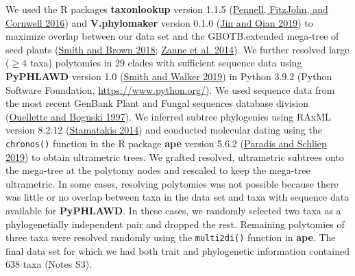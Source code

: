 \documentclass[
  12pt,
]{article}
\begin{document}
We used the R packages \textbf{taxonlookup} version 1.1.5 (\protect\hyperlink{ref-pennell_simple_2016}{Pennell, FitzJohn, and Cornwell 2016}) and \textbf{V.phylomaker} version 0.1.0 (\protect\hyperlink{ref-jin_vphylomaker_2019}{Jin and Qian 2019}) to maximize overlap between our data set and the GBOTB.extended mega-tree of seed plants (\protect\hyperlink{ref-smith_constructing_2018}{Smith and Brown 2018}; \protect\hyperlink{ref-zanne_three_2014}{Zanne et al. 2014}). We further resolved large (\(\ge4\) taxa) polytomies in 29 clades with sufficient sequence data using \textbf{PyPHLAWD} version 1.0 (\protect\hyperlink{ref-smith_pyphlawd_2019}{Smith and Walker 2019}) in Python 3.9.2 (Python Software Foundation, \url{https://www.python.org/}). We used sequence data from the most recent GenBank Plant and Fungal sequences database division (\protect\hyperlink{ref-ouellette_database_1997}{Ouellette and Boguski 1997}). We inferred subtree phylogenies using RAxML version 8.2.12 (\protect\hyperlink{ref-stamatakis_raxml_2014}{Stamatakis 2014}) and conducted molecular dating using the \texttt{chronos()} function in the R package \textbf{ape} version 5.6.2 (\protect\hyperlink{ref-paradis_ape_2019}{Paradis and Schliep 2019}) to obtain ultrametric trees. We grafted resolved, ultrametric subtrees onto the mega-tree at the polytomy nodes and rescaled to keep the mega-tree ultrametric. In some cases, resolving polytomies was not possible because there was little or no overlap between taxa in the data set and taxa with sequence data available for \textbf{PyPHLAWD}. In these cases, we randomly selected two taxa as a phylogenetially independent pair and dropped the rest. Remaining polytomies of three taxa were resolved randomly using the \texttt{multi2di()} function in \textbf{ape}. The final data set for which we had both trait and phylogenetic information contained 638 taxa (Notes S3).

\clearpage
\end{document}
